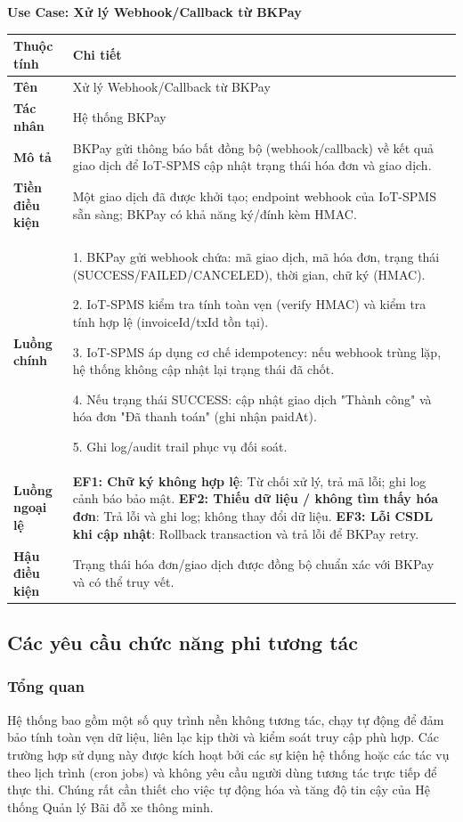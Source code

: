 \noindent \textbf{Use Case: Xử lý Webhook/Callback từ BKPay} \\
\renewcommand{\arraystretch}{1.6}
\begin{xltabular}{\textwidth}{|l|X|}
\hline
\textbf{Thuộc tính} & \textbf{Chi tiết} \\
\hline
\textbf{Tên} & Xử lý Webhook/Callback từ BKPay \\
\hline
\textbf{Tác nhân} & Hệ thống BKPay \\
\hline
\textbf{Mô tả} & BKPay gửi thông báo bất đồng bộ (webhook/callback) về kết quả giao dịch để IoT-SPMS cập nhật trạng thái hóa đơn và giao dịch. \\
\hline
\textbf{Tiền điều kiện} & Một giao dịch đã được khởi tạo; endpoint webhook của IoT-SPMS sẵn sàng; BKPay có khả năng ký/đính kèm HMAC. \\
\hline
\textbf{Luồng chính} &
1. BKPay gửi webhook chứa: mã giao dịch, mã hóa đơn, trạng thái (SUCCESS/FAILED/CANCELED), thời gian, chữ ký (HMAC).

2. IoT-SPMS kiểm tra tính toàn vẹn (verify HMAC) và kiểm tra tính hợp lệ (invoiceId/txId tồn tại).

3. IoT-SPMS áp dụng cơ chế idempotency: nếu webhook trùng lặp, hệ thống không cập nhật lại trạng thái đã chốt.

4. Nếu trạng thái SUCCESS: cập nhật giao dịch "Thành công" và hóa đơn "Đã thanh toán" (ghi nhận paidAt).

5. Ghi log/audit trail phục vụ đối soát.
\\
\hline

\textbf{Luồng ngoại lệ} &
\textbf{EF1: Chữ ký không hợp lệ}: Từ chối xử lý, trả mã lỗi; ghi log cảnh báo bảo mật.\newline
\textbf{EF2: Thiếu dữ liệu / không tìm thấy hóa đơn}: Trả lỗi và ghi log; không thay đổi dữ liệu.\newline
\textbf{EF3: Lỗi CSDL khi cập nhật}: Rollback transaction và trả lỗi để BKPay retry.
\\
\hline

\textbf{Hậu điều kiện} & Trạng thái hóa đơn/giao dịch được đồng bộ chuẩn xác với BKPay và có thể truy vết.\\
\hline
\end{xltabular}

\newpage
\subsection{Các yêu cầu chức năng phi tương tác}
\subsubsection{Tổng quan}
Hệ thống bao gồm một số quy trình nền không tương tác, chạy tự động để đảm bảo tính toàn vẹn dữ liệu, liên lạc kịp thời và kiểm soát truy cập phù hợp. Các trường hợp sử dụng này được kích hoạt bởi các sự kiện hệ thống hoặc các tác vụ theo lịch trình (cron jobs) và không yêu cầu người dùng tương tác trực tiếp để thực thi. Chúng rất cần thiết cho việc tự động hóa và tăng độ tin cậy của Hệ thống Quản lý Bãi đỗ xe thông minh.

